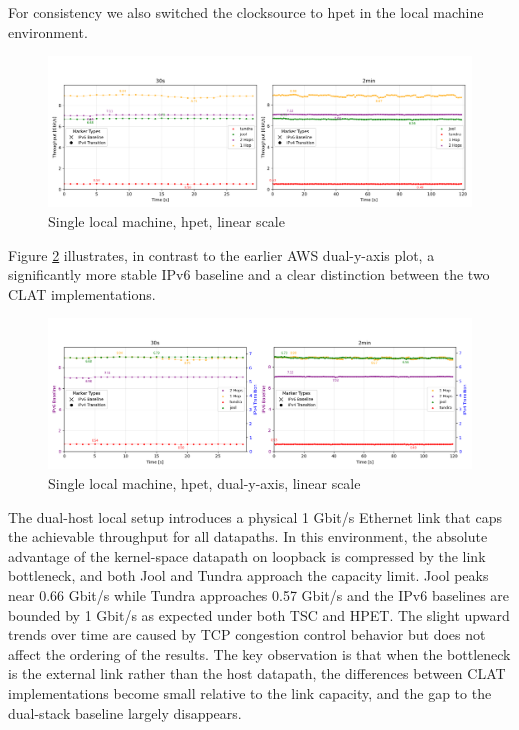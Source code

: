 For consistency we also switched the clocksource to hpet in the local machine environment.

\begin{figure}[H]
    \centering
    \includegraphics[width=1\textwidth]{resources/plots/CombinedPlot/TCP/Single_tcp_sameScale_hpet_linear.png}
    \caption{Single local machine, hpet, linear scale}
    \label{fig:Local_tcp_sameScale_hpet_linear}
\end{figure}

Figure \ref{fig:Local_tcp_dualAxis_hpet_linear} illustrates, in contrast to the earlier AWS dual-y-axis plot, a significantly more stable IPv6 baseline and a clear distinction between the two CLAT implementations.

\begin{figure}[H]
    \centering
    \includegraphics[width=1\textwidth]{resources/plots/JitterPlot/Single_tcp_dualAxis_hpet_linear.png}
    \caption{Single local machine, hpet, dual-y-axis, linear scale}
    \label{fig:Local_tcp_dualAxis_hpet_linear}
\end{figure}



The dual-host local setup introduces a physical 1 Gbit/s Ethernet link that caps the achievable throughput for all datapaths. In this environment, the absolute advantage of the kernel-space datapath on loopback is compressed by the link bottleneck, and both Jool and Tundra approach the capacity limit. Jool peaks near 0.66 Gbit/s while Tundra approaches 0.57 Gbit/s and the IPv6 baselines are bounded by 1 Gbit/s as expected under both TSC and HPET. The slight upward trends over time are caused by TCP congestion control behavior\cite{rfc5681} but does not affect the ordering of the results. The key observation is that when the bottleneck is the external link rather than the host datapath, the differences between CLAT implementations become small relative to the link capacity, and the gap to the dual-stack baseline largely disappears.


